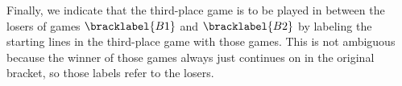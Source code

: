 {    Finally, we indicate that the third-place game is to be played in between the losers of games $\bracklabel{B1}$ and $\bracklabel{B2}$ by labeling the starting lines in the third-place game with those games. This is not ambiguous because the winner of those games always just continues on in the original bracket, so those labels refer to the losers.
}
